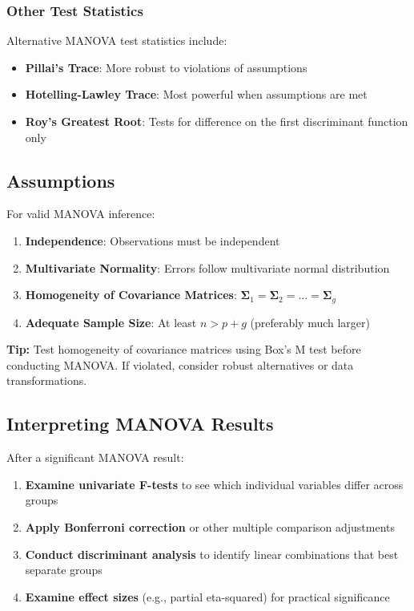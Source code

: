 \documentclass[
]{article}
\begin{document}
\subsubsection{Other Test Statistics}

Alternative MANOVA test statistics include:

\begin{itemize}
\item
  \textbf{Pillai's Trace}: More robust to violations of assumptions
\item
  \textbf{Hotelling-Lawley Trace}: Most powerful when assumptions are
  met
\item
  \textbf{Roy's Greatest Root}: Tests for difference on the first
  discriminant function only
\end{itemize}

\textbf{ }

\subsection{Assumptions}

For valid MANOVA inference:

\begin{enumerate}
\item
  \textbf{Independence}: Observations must be independent
\item
  \textbf{Multivariate Normality}: Errors follow multivariate normal
  distribution
\item
  \textbf{Homogeneity of Covariance Matrices}:
  \(\mathbf{\Sigma}_{1} = \mathbf{\Sigma}_{2} = \ldots = \mathbf{\Sigma}_{g}\)
\item
  \textbf{Adequate Sample Size}: At least \(n > p + g\) (preferably much
  larger)
\end{enumerate}

\textbf{Tip: } Test homogeneity of covariance matrices using Box's M
test before conducting MANOVA. If violated, consider robust alternatives
or data transformations.

\textbf{ }

\subsection{Interpreting MANOVA Results}

After a significant MANOVA result:

\begin{enumerate}
\item
  \textbf{Examine univariate F-tests} to see which individual variables
  differ across groups
\item
  \textbf{Apply Bonferroni correction} or other multiple comparison
  adjustments
\item
  \textbf{Conduct discriminant analysis} to identify linear combinations
  that best separate groups
\item
  \textbf{Examine effect sizes} (e.g., partial eta-squared) for
  practical significance
\end{enumerate}
\end{document}

